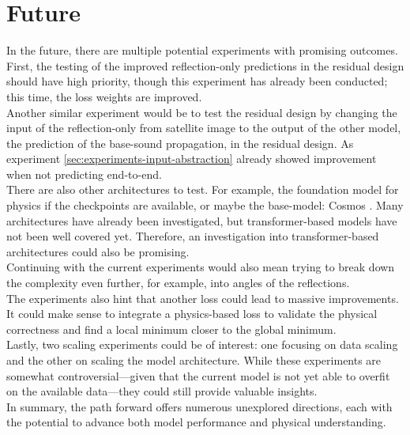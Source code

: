 	\section{Future}
	\label{sec:sum-future}
		In the future, there are multiple potential experiments with promising outcomes.\\
		First, the testing of the improved reflection-only predictions in the residual design should have high priority, though this experiment has already been conducted; this time, the loss weights are improved.\\
		Another similar experiment would be to test the residual design by changing the input of the reflection-only from satellite image to the output of the other model, the prediction of the base-sound propagation, in the residual design. As experiment \ref{sec:experiments-input-abstraction} already showed improvement when not predicting end-to-end.\\
		There are also other architectures to test. For example, the foundation model for physics if the checkpoints are available, or maybe the base-model: Cosmos \cite{nvidia2025cosmosworldfoundationmodel}.
		\clearpage
		Many architectures have already been investigated, but transformer-based models have not been well covered yet. Therefore, an investigation into transformer-based architectures could also be promising.\\
		Continuing with the current experiments would also mean trying to break down the complexity even further, for example, into angles of the reflections. \\
		The experiments also hint that another loss could lead to massive improvements. It could make sense to integrate a physics-based loss to validate the physical correctness and find a local minimum closer to the global minimum.\\
		Lastly, two scaling experiments could be of interest: one focusing on data scaling and the other on scaling the model architecture. While these experiments are somewhat controversial—given that the current model is not yet able to overfit on the available data—they could still provide valuable insights.\\
		In summary, the path forward offers numerous unexplored directions, each with the potential to advance both model performance and physical understanding.
	
	
	